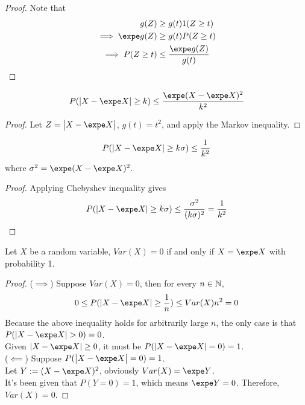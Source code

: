 \documentclass{article}
\begin{document}
   	\begin{proof} Note that
   		\begin{align}
   			g(Z) &\geq g(t) 1(Z \geq t) \\
   			\implies \expe g(Z) &\geq g(t) P(Z \geq t) \\
   			\implies P(Z \geq t) &\leq \frac{\expe g(Z)}{g(t)}
   		\end{align}
   	\end{proof}
   	
   	\begin{corollary}
   		\begin{align}
   			P(|X - \expe X| \geq k) \leq \frac{\expe (X - \expe X)^2}{k^2}
   		\end{align}
   	\end{corollary}
   	
   	\begin{proof}
   		Let $Z = \abs{X - \expe X}$, $g(t) = t^2$, and apply the Markov inequality.
   	\end{proof}
   	
   	\begin{corollary}
   		\begin{align}
   			P(|X - \expe X| \geq k \sigma) \leq \frac{1}{k^2}
   		\end{align}
   		where $\sigma^2 = \expe (X - \expe X)^2$.
   	\end{corollary}
   	
   	\begin{proof}
   		Applying Chebyshev inequality gives
   		\begin{align}
   			P(|X - \expe X| \geq k \sigma) \leq \frac{\sigma^2}{(k \sigma)^2} = \frac{1}{k^2}
   		\end{align}
   	\end{proof}
   	
   	\begin{corollary}
   		Let $X$ be a random variable, $Var(X) = 0$ if and only if $X = \expe X$ with probability 1.
   	\end{corollary}
   	
   	\begin{proof}
   		($\implies$) Suppose $Var(X) = 0$, then for every $n \in \mathbb{N}$,
   		\begin{align}
   			0 \leq P(|X - \expe X| \geq \frac{1}{n}) \leq Var(X) n^2 = 0
   		\end{align}
   		Because the above inequality holds for arbitrarily large $n$, the only case is that $P(|X - \expe X| > 0) = 0$.\\
   		Given $|X - \expe X| \geq 0$, it must be $P(|X - \expe X| = 0) = 1$. \\
   		($\impliedby$) Suppose $P(\abs{X - \expe X} = 0) = 1$. \\
   		Let $Y := (X - \expe X)^2$, obviously $Var(X) = \expe Y$. \\
   		It's been given that $P(Y = 0) = 1$, which means $\expe Y = 0$. Therefore, $Var(X) = 0$.
   	\end{proof}
   	
\end{document}
